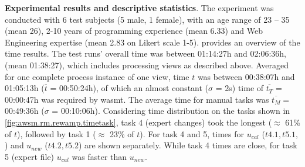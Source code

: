 \textbf{Experimental results and descriptive statistics}.
The experiment was conducted with 6 test subjects (5 male, 1 female), with an age range of 23 -- 35 (mean 26), 2-10 years of programming experience (mean 6.33) and \gls{Web Engineering} expertise (mean 2.83 on Likert scale 1-5).
 provides an overview of the time results.
The test runs' overall time was between 01:14:27h and 02:06:36h, (mean 01:38:27), which includes processing views as described above.
Averaged for one complete process instance of one view, time \(t\) was between 00:38:07h and 01:05:13h (\(\overline t\) = 00:50:24h), of which an almost constant (\(\sigma\) = 2s) time of \(\overline{t_T}\) = 00:00:47h was required by \gls{wasmt}.
The average time for manual tasks was \(\overline{t_M}=\) 00:49:36h (\(\sigma\) = 00:10:06h).
Considering time distribution on the tasks shown in \cref{fig:awsm.rm.rewamp.timetask}, task 4 (expert changes) took the longest (\(\approx\) 61\% of \(t\)), followed by task 1 (\(\approx\) 23\% of \(t\)).
For task 4 and 5, times for \(u_{cal}\) (\(t4.1, t5.1,\)) and \(u_{new}\) (\(t4.2, t5.2\)) are shown separately.
While task 4 times are close, for task 5 (expert file) \(u_{cal}\) was faster than \(u_{new}\).


